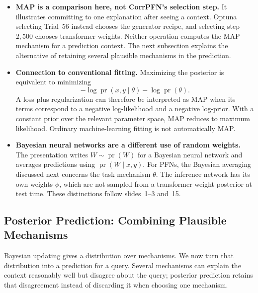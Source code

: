 \documentclass[11pt]{article}
\newcommand{\pr}{\operatorname{pr}}
\newenvironment{notes}
  {\begin{itemize}\setlength{\itemsep}{0.45em}\setlength{\parsep}{0pt}}
  {\end{itemize}}
\begin{document}
\begin{notes}
    \item \textbf{MAP is a comparison here, not CorrPFN's selection step.}
    It illustrates committing to one explanation after seeing a
    context. Optuna selecting Trial~56 instead chooses the generator
    recipe, and selecting step~\(2{,}500\) chooses transformer
    weights. Neither operation computes the MAP mechanism for a
    prediction context. The next subsection explains the alternative
    of retaining several plausible mechanisms in the prediction.

    \item \textbf{Connection to conventional fitting.} Maximizing
    the posterior is equivalent to minimizing
    \[
        -\log\pr(x,y\mid\theta)-\log\pr(\theta).
    \]
    A loss plus regularization can therefore be interpreted as MAP
    when its terms correspond to a negative log-likelihood and a
    negative log-prior. With a constant prior over the relevant
    parameter space, MAP reduces to maximum likelihood.
    Ordinary machine-learning fitting is not automatically MAP.

    \item \textbf{Bayesian neural networks are a different use of
    random weights.} The presentation writes \(W\sim\pr(W)\)
    for a Bayesian neural network and averages predictions using
    \(\pr(W\mid x,y)\). For PFNs, the Bayesian averaging discussed
    next concerns the task mechanism \(\theta\).
    The inference network has its own weights \(\phi\), which
    are not sampled from a transformer-weight posterior at test time.
    These distinctions follow slides~1--3 and~15.
\end{notes}

\subsection{Posterior Prediction: Combining Plausible Mechanisms}
\label{sec:posterior-prediction}

Bayesian updating gives a distribution over mechanisms. We now
turn that distribution into a prediction for a query. Several
mechanisms can explain the context reasonably well but disagree
about the query; posterior prediction retains that disagreement
instead of discarding it when choosing one mechanism.
\end{document}
